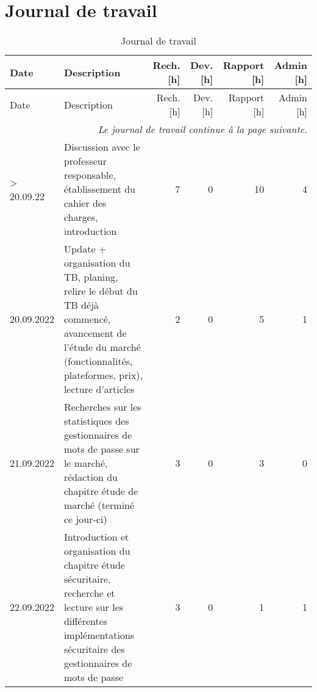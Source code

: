 

\chapter{Journal de travail}

\begin{landscape}

\begin{longtable}[c]{lp{10cm}rrrr}
    \caption{Journal de travail}\\

    \hline
    Date & Description & Rech. [h] & Dev. [h] & Rapport [h] & Admin [h] \\
    \hline
    \endfirsthead
    
    \hline
    Date & Description & Rech. [h] & Dev. [h] & Rapport [h] & Admin [h] \\
    \hline
    \endhead
    
    \multicolumn{6}{r}{\small \it Le journal de travail continue à la page suivante.} \\
    \normalsize
    \endfoot
    
    \hline
    \endlastfoot


    > 20.09.22
    & Discussion avec le professeur responsable, établissement du cahier des charges, introduction
    & 7 %
    & 0 %
    & 10 %
    & 4\\ %
    
	20.09.2022 
	& Update + organisation du TB, planing, relire le début du TB déjà commencé, avancement de l’étude du marché (fonctionnalités, plateformes, prix), lecture d’articles
	& 2 %
	& 0 %
	& 5 %
	& 1\\ %

	21.09.2022 
	& Recherches sur les statistiques des gestionnaires de mots de passe sur le marché, rédaction du chapitre étude de marché (terminé ce jour-ci)
	& 3 %
	& 0 %
	& 3 %
	& 0\\ %

	22.09.2022
	& Introduction et organisation du chapitre étude sécuritaire, recherche et lecture sur les différentes implémentations sécuritaire des gestionnaires de mots de passe
	& 3 %
	& 0 %
	& 1 %
	& 1\\ %


\end{longtable}
\end{landscape}
